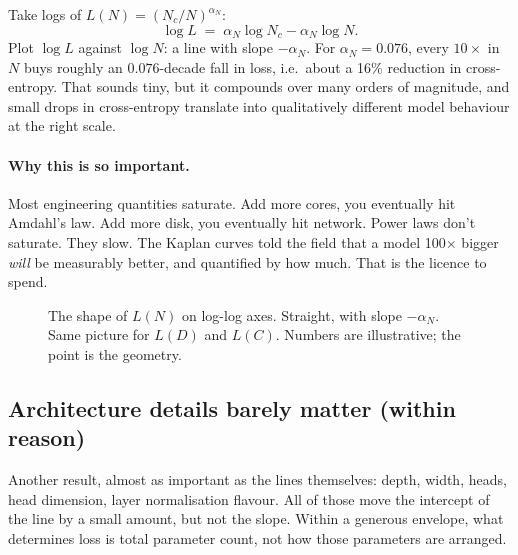 Take logs of \(L(N) = (N_c/N)^{\alpha_N}\):
\begin{equation}
  \log L \;=\; \alpha_N \log N_c - \alpha_N \log N.
\end{equation}
Plot \(\log L\) against \(\log N\): a line with slope \(-\alpha_N\). For
\(\alpha_N = 0.076\), every \(10\times\) in \(N\) buys roughly an
\(0.076\)-decade fall in loss, i.e.\ about a 16\% reduction in cross-entropy.
That sounds tiny, but it compounds over many orders of
magnitude, and small drops in cross-entropy translate into qualitatively
different model behaviour at the right scale.

\paragraph{Why this is so important.} Most engineering quantities saturate.
Add more cores, you eventually hit Amdahl's law. Add more disk, you eventually
hit network. Power laws don't saturate. They slow. The Kaplan curves told
the field that a model 100$\times$ bigger \emph{will} be measurably better,
and quantified by how much. That is the licence to spend.

\begin{figure}
\centering
{}
\caption{The shape of \(L(N)\) on log-log axes. Straight, with slope
\(-\alpha_N\). Same picture for \(L(D)\) and \(L(C)\). Numbers are
illustrative; the point is the geometry.}
\end{figure}

\subsection{Architecture details barely matter (within reason)}

Another result, almost as important as the lines themselves: depth, width,
heads, head dimension, layer normalisation flavour. All of those move the
intercept of the line by a small amount, but not the slope. Within a
generous envelope, what determines loss is total parameter count, not how
those parameters are arranged.

